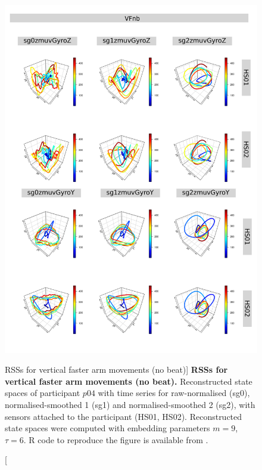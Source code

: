 \begin{figure}
\centering
\includegraphics[height=0.8\textheight]{rss_VFnb_p04}
\caption
	[RSSs for vertical faster arm movements (no beat)]{
	{\bf RSSs for vertical faster arm movements (no beat).}
	Reconstructed state spaces of participant $p04$
	with time series for raw-normalised (sg0), 
	normalised-smoothed 1 (sg1) and 
	normalised-smoothed 2 (sg2), 
	with sensors attached to the participant (HS01, HS02).
	Reconstructed state spaces were computed with 
	embedding parameters $m=9$, $\tau=6$.
	R code to reproduce the figure is available from \cite{xochicale2018}.
        }
     \label{fig:rss_VFnb_p04}
\end{figure}



